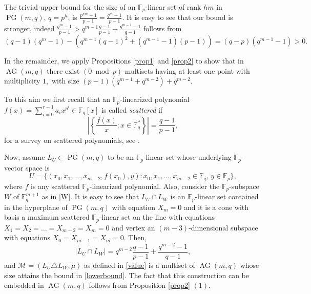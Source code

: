 \documentclass[12pt]{article}
\newcommand{\cM}{{\mathcal M}}
\newcommand{\F}{{\mathbb F}}
\DeclareMathOperator{\PG}{{PG}}
\DeclareMathOperator{\AG}{{AG}}
\begin{document}
	The trivial upper bound for the size of an $\F_p$-linear set of rank $hm$ in $\PG(m,q)$, $q=p^h$, is $\frac{p^{hm}-1}{p-1}=\frac{q^m-1}{p-1}$.  
	It is easy to see that our bound is stronger, indeed $\frac{q^{m}-1}{p-1} >  q^{m-1}\frac{q-1}{p-1}+\frac{q^{m-1}-1 }{q-1}$ follows from
	\[     (q-1)(q^m-1) - (q^{m-1}(q-1)^2+(q^{m-1}-1)(p-1)) = (q-p)(q^{m-1}-1) >0.
	\] 
	
	\bigskip 
	In the remainder, we apply Propositions \ref{prop1} and \ref{prop2} to show that in $\AG(m,q)$ there exist $(0 \bmod p)$-multisets having at least one point with multiplicity $1,$ with size $(p-1)(q^{m-1}+q^{m-2})+q^{m-2}$.
	
	\medskip
	\noindent To this aim we first recall that an $\F_p$-linearized polynomial  $f(x)=\sum_{i=0}^{r-1}a_i x^{p^i}\in \F_q[x]$ is called \textit{scattered} if 
	$$ \left \vert \left \{\frac{f(x)}{x} \colon x \in \F_q^* \right \} \right \vert= \frac{q-1}{p-1}, $$
	for a survey on scattered polynomials, see \cite{survey}.
	
	Now, assume $L_U \subset \PG(m,q)$ to be an $\F_p$-linear set whose underlying $\F_p$-vector space is
	\[ U=\{ (x_0,x_1,\ldots,x_{m-2},f(x_0),y) \colon x_0,x_1,\ldots,x_{m-2} \in \F_q,\, y\in \F_p \},\] where $f$ is any scattered $\F_p$-linearized polynomial. Also, consider the $\F_p$-subspace $W$ of $\F_{q}^{m+1}$ as in \eqref{W}. It is easy to see that $L_U \cap L_W$ is an $\F_p$-linear set contained in the hyperplane of $\PG(m,q)$ with equation $X_m=0$ and it is a cone with basis a maximum scattered $\F_p$-linear set on the line with equations $X_1=X_2=\ldots=X_{m-2}=X_m=0$ and vertex an $(m-3)$-dimensional subspace with equations $X_0=X_{m-1}=X_m=0$. Then,
	$$ \vert L_U \cap L_W \vert =q^{m-2}\frac{q-1}{p-1}+ \frac{q^{m-2}-1}{q-1},$$
	and  $\cM= (L_U \triangle L_W, \mu)$ as defined in \eqref{value}  is a multiset of $\AG(m,q)$ whose size attains the bound in \eqref{lowerbound}. The fact that this construction can be embedded in $\AG(m,q)$ follows from Proposition \ref{prop2} $(1)$.
	
\end{document}
